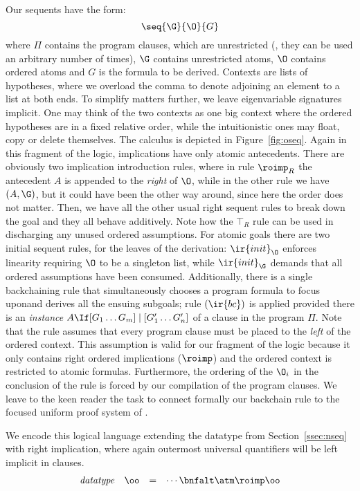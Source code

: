 \documentclass[final]{svjour3}
\begin{document}
Our sequents have the form:
$$\seq{\G}{\O}{G}$$
where ${\Pi}$ contains the program clauses, which are unrestricted
(\ie, they can be used an arbitrary number of times), $\G$ contains
unrestricted atoms, ${\O}$ contains ordered atoms and $G$ is the
formula to be derived. Contexts are {lists} of hypotheses, where
we overload the comma to denote adjoining an element to a list at both
ends. To simplify matters further, we leave eigenvariable signatures
implicit.
One may think of the two
contexts as one big context where the ordered hypotheses are in a fixed
relative order, while the intuitionistic ones may float, copy or
delete themselves.  The calculus is depicted in Figure~\ref{fig:oseq}.
Again in this fragment of the logic, implications have only atomic
antecedents.  There are obviously two implication introduction rules,
where in rule $\roimp_R$ the antecedent $A$ is appended to the
\emph{right} of $\O$, while in the other rule we have $(A,\G)$, but it
could have been the other way around, since here the order does not
matter. Then, we have all the other usual right sequent rules to break down the
goal and they all behave additively. Note how the $\top_R$ rule can be
used in discharging any unused ordered assumptions.  For atomic goals
there are two initial sequent rules, for the leaves of the derivation:
$\ir{init}_\O$ enforces linearity requiring $\O$ to be a singleton
list, while $\ir{init}_\G$ demands that all ordered assumptions
have been consumed. Additionally, there is a single backchaining rule
that simultaneously chooses a program formula to focus uponand derives all the ensuing subgoals; rule $(\ir{bc})$ is applied
provided there is an \emph{instance} $\sbc{A}{[G_1 \ldots G_m]}{[G'_1
  \ldots G'_n]}$ of a clause in the program $\Pi$.
Note that the rule assumes that every program clause
must be placed to the \emph{left} of the ordered context.  This assumption is
valid for our fragment of the logic because it only contains right
ordered implications ($\roimp$) and the ordered context is restricted
to atomic formulas. Furthermore, the ordering of the ${\O}_i$ in the
conclusion of the rule is forced by our compilation of the program
clauses. We leave to the keen reader the task to
connect  formally our backchain rule to the focused uniform proof system of
\opcit \cite{Polakow01phd}.



We encode this logical language extending the datatype from
Section~\ref{ssec:nseq} with right implication, where again outermost
universal quantifiers will be left implicit in clauses.
\[ \begin{array}{rrcl}
 \mbox{\textit{datatype}}& \oo & = &  \cdots\bnfalt \atm\roimp  \oo
\end{array} \] 
\end{document}
